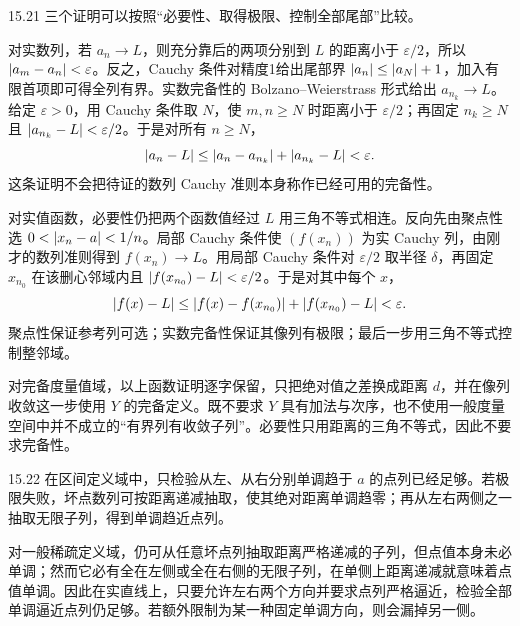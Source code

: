 \begin{solution}{15.21}
三个证明可以按照“必要性、取得极限、控制全部尾部”比较。

对实数列，若 \(a_n\to L\)，则充分靠后的两项分别到 \(L\) 的距离小于 \(\varepsilon/2\)，所以 \(\left|a_m-a_n\right|<\varepsilon\)。反之，Cauchy 条件对精度1给出尾部界 \(\left|a_n\right|\le\left|a_N\right|+1\)，加入有限首项即可得全列有界。实数完备性的 Bolzano--Weierstrass 形式给出 \(a_{n_k}\to L\)。给定 \(\varepsilon>0\)，用 Cauchy 条件取 \(N\)，使 \(m,n\ge N\) 时距离小于 \(\varepsilon/2\)；再固定 \(n_k\ge N\) 且 \(\left|a_{n_k}-L\right|<\varepsilon/2\)。于是对所有 \(n\ge N\)，
\[
 \left|a_n-L\right|\le\left|a_n-a_{n_k}\right|+\left|a_{n_k}-L\right|<\varepsilon.
\]
这条证明不会把待证的数列 Cauchy 准则本身称作已经可用的完备性。

对实值函数，必要性仍把两个函数值经过 \(L\) 用三角不等式相连。反向先由聚点性选 \(0<\left|x_n-a\right|<1/n\)。局部 Cauchy 条件使 \((f(x_n))\) 为实 Cauchy 列，由刚才的数列准则得到 \(f(x_n)\to L\)。用局部 Cauchy 条件对 \(\varepsilon/2\) 取半径 \(\delta\)，再固定 \(x_{n_0}\) 在该删心邻域内且 \(\left|f(x_{n_0})-L\right|<\varepsilon/2\)。于是对其中每个 \(x\)，
\[
 \left|f(x)-L\right|\le\left|f(x)-f(x_{n_0})\right|+\left|f(x_{n_0})-L\right|<\varepsilon.
\]
聚点性保证参考列可选；实数完备性保证其像列有极限；最后一步用三角不等式控制整邻域。

对完备度量值域，以上函数证明逐字保留，只把绝对值之差换成距离 \(d\)，并在像列收敛这一步使用 \(Y\) 的完备定义。既不要求 \(Y\) 具有加法与次序，也不使用一般度量空间中并不成立的“有界列有收敛子列”。必要性只用距离的三角不等式，因此不要求完备性。
\end{solution}

\begin{solution}{15.22}
在区间定义域中，只检验从左、从右分别单调趋于 \(a\) 的点列已经足够。若极限失败，坏点数列可按距离递减抽取，使其绝对距离单调趋零；再从左右两侧之一抽取无限子列，得到单调趋近点列。

对一般稀疏定义域，仍可从任意坏点列抽取距离严格递减的子列，但点值本身未必单调；然而它必有全在左侧或全在右侧的无限子列，在单侧上距离递减就意味着点值单调。因此在实直线上，只要允许左右两个方向并要求点列严格逼近，检验全部单调逼近点列仍足够。若额外限制为某一种固定单调方向，则会漏掉另一侧。
\end{solution}

